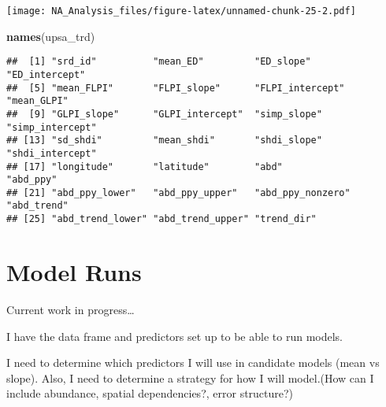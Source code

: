 \documentclass[
]{article}
\newenvironment{Shaded}{\begin{snugshade}}{\end{snugshade}}
\newcommand{\FunctionTok}[1]{\textcolor[rgb]{0.13,0.29,0.53}{\textbf{#1}}}
\newcommand{\NormalTok}[1]{#1}
\begin{document}
\texttt{[image: NA\_Analysis\_files/figure-latex/unnamed-chunk-25-2.pdf]}

\begin{Shaded}
\begin{Highlighting}[]
\FunctionTok{names}\NormalTok{(upsa\_trd)}
\end{Highlighting}
\end{Shaded}

\begin{verbatim}
##  [1] "srd_id"          "mean_ED"         "ED_slope"        "ED_intercept"   
##  [5] "mean_FLPI"       "FLPI_slope"      "FLPI_intercept"  "mean_GLPI"      
##  [9] "GLPI_slope"      "GLPI_intercept"  "simp_slope"      "simp_intercept" 
## [13] "sd_shdi"         "mean_shdi"       "shdi_slope"      "shdi_intercept" 
## [17] "longitude"       "latitude"        "abd"             "abd_ppy"        
## [21] "abd_ppy_lower"   "abd_ppy_upper"   "abd_ppy_nonzero" "abd_trend"      
## [25] "abd_trend_lower" "abd_trend_upper" "trend_dir"
\end{verbatim}

\section{Model Runs}\label{model-runs}

Current work in progress\ldots{}

I have the data frame and predictors set up to be able to run models.

I need to determine which predictors I will use in candidate models
(mean vs slope). Also, I need to determine a strategy for how I will
model.(How can I include abundance, spatial dependencies?, error
structure?)
\end{document}
